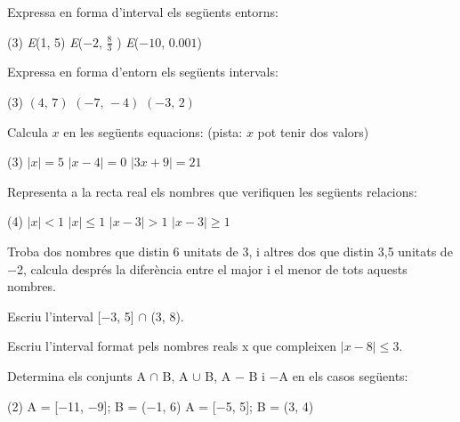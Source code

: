  
\begin{mylist}
 
	\exer  Expressa en forma d'interval els següents entorns:
	\begin{tasks}(3)
		\task \textit{E}(1, 5)
		\task \textit{E}($-2$, $\frac{8}{3} $ )
		\task \textit{E}($-10$, $0.001$)
	\end{tasks}
\answers{[$(-4,6)$, $(-14/3,2/3)$, $(-10.001,-9.999)$]}
 
 
	\exer  Expressa en forma d'entorn els següents intervals:
	\begin{tasks}(3)
		\task $(4,\, 7)$
		\task $(-7,\, -4)$
		\task $(-3,\, 2)$
	\end{tasks}
\answers{[$(5.5,1.5)$, $(-5.5,1.5)$, $(-0.5,2.5)$]}
 

\exer Calcula $x$ en les següents equacions: (pista: $x$ pot tenir dos valors)
\begin{tasks}(3)
	\task $|x|=5$
	\task $|x-4|=0$
	\task $|3x+9|=21$
\end{tasks}
\answers{[$x=$ 5 i --5, $x=$ 4, $x=$ --10 i 4]}
 


\exer Representa a la recta real els nombres que verifiquen les següents relacions:
\begin{tasks}(4)
	\task $|x|<1$
	\task $|x|\leq 1$
	\task $|x-3|>1$
	\task $|x-3|\geq 1$
\end{tasks}
\answers[cols=1]{[$(-1,1)$, $(-\infty,-1]\cup [1,+\infty]$, $(-\infty,2)\cup(4,+\infty)$, $(-\infty,2]\cup[4,+\infty)$]}


\exer Troba dos nombres que distin 6 unitats de 3, i altres dos que distin 3,5 unitats de $-$2, calcula després la diferència entre el major i el menor de tots aquests nombres. 

\exer Escriu l'interval [$-$3, 5] $\mathrm{\cap}$ (3, 8).
\answers{$[-3, 8)$}
 
\exer Escriu l'interval format pels nombres reals x que compleixen $|x-8|\leq 3$. 
\answers{$[5,11]$}

\exer Determina els conjunts A $\mathrm{\cap}$  B, A  $\cup$ B, A $-$ B i $-$A en els casos següents:
\begin{tasks}(2)
	\task A = [\textit{$-$}11, \textit{$-$}9]; B = (\textit{$-$}1, 6)
	\task  A = [\textit{$-$}5, 5]; B = (3, 4)	
\end{tasks}
 \answers{[$A\cap B=\emptyset$;\par $A\cup B=[-11,-9] \cup (-1,6)$;\par $A-B=A$,  
 		   $A\cap B=B$; $A\cup B=A$;\par $A-B=[-5,3]\cup [4,5]$]}
 
\end{mylist}
 

